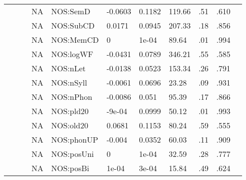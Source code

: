 \begin{table}[ht]
\begin{tabular}{lllllllllll}
   &  &  & NA & NOS:SemD & -0.0603 & 0.1182 & 119.66 & .51 & .610 &   \\ 
   &  &  & NA & NOS:SubCD & 0.0171 & 0.0945 & 207.33 & .18 & .856 &   \\ 
   &  &  & NA & NOS:MemCD & 0 & 1e-04 & 89.64 & .01 & .994 &   \\ 
   &  &  & NA & NOS:logWF & -0.0431 & 0.0789 & 346.21 & .55 & .585 &   \\ 
   &  &  & NA & NOS:nLet & -0.0138 & 0.0523 & 153.34 & .26 & .791 &   \\ 
   &  &  & NA & NOS:nSyll & -0.0061 & 0.0696 & 23.28 & .09 & .931 &   \\ 
   &  &  & NA & NOS:nPhon & -0.0086 & 0.051 & 95.39 & .17 & .866 &   \\ 
   &  &  & NA & NOS:pld20 & -9e-04 & 0.0999 & 50.12 & .01 & .993 &   \\ 
   &  &  & NA & NOS:old20 & 0.0681 & 0.1153 & 80.24 & .59 & .555 &   \\ 
   &  &  & NA & NOS:phonUP & -0.004 & 0.0352 & 60.03 & .11 & .909 &   \\ 
   &  &  & NA & NOS:posUni & 0 & 1e-04 & 32.59 & .28 & .777 &   \\ 
   &  &  & NA & NOS:posBi & 1e-04 & 3e-04 & 15.84 & .49 & .624 &   \\ 
   \hline
\end{tabular}
\endgroup
\end{table}
